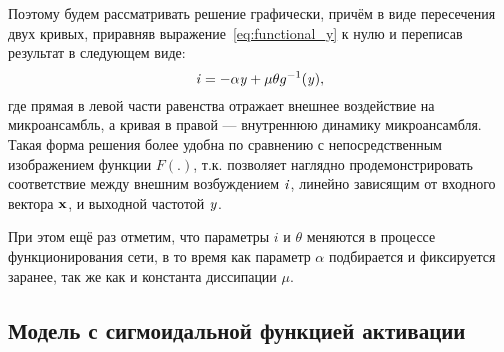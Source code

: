 Поэтому будем рассматривать решение графически, причём в виде пересечения двух кривых, приравняв выражение~\eqref{eq:functional_y} к нулю и переписав результат в следующем виде:
\begin{equation}
    \label{eq:graphic_solution}
    \mathit{i} = - \alpha \mathit{y} + \mu \theta g^{-1}(\mathit{y}),
\end{equation}
где прямая в левой части равенства отражает внешнее воздействие на микроансамбль, а кривая в правой --- внутреннюю динамику микроансамбля. Такая форма решения более удобна по сравнению с непосредственным изображением функции $F(.)$, т.к. позволяет наглядно продемонстрировать соответствие между внешним возбуждением $\mathit{i}$, линейно зависящим от входного вектора $\mathrm{\mathbf{x}}$, и выходной частотой $\mathit{y}$.

При этом ещё раз отметим, что параметры $i$ и $\theta$ меняются в процессе функционирования сети, в то время как параметр $\alpha$ подбирается и фиксируется заранее, так же как и константа диссипации $\mu$.

\subsection{Модель с сигмоидальной функцией активации} \label{subsection:analysis_sigm}

